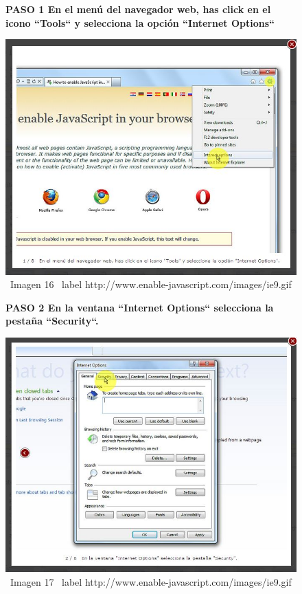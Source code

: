 \documentclass[11pt]{article} %
\begin{document}
\begin{figure}
\begin{center}
\begin{center}
\bf PASO 1
En el menú del navegador web, has click en el icono ``Tools`` y selecciona la opción ``Internet Options``
\end{center}
\includegraphics[height=8 cm, width=8 cm] {imagenes/explorer 01.JPG}
\newline
\newline
\ Imagen 16
\ label {http://www.enable-javascript.com/images/ie9.gif }

\begin{center}
\bf PASO 2
En la ventana ``Internet Options`` selecciona la pestaña ``Security``.
\end{center}

\includegraphics[height=8 cm, width=8 cm] {imagenes/explorer 02.JPG}
\newline
\newline
\ Imagen 17
\ label {http://www.enable-javascript.com/images/ie9.gif }

\end{center}
\end{figure}
\end{document}
